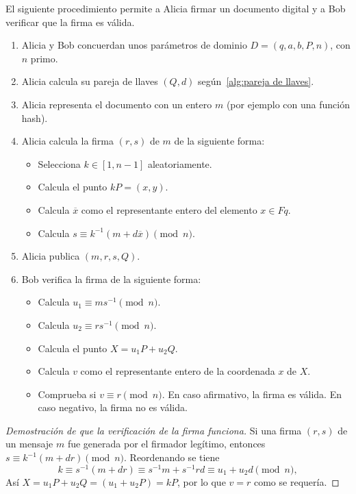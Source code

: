 \begin{protocolo}[ECDSA]
    El siguiente procedimiento permite a Alicia firmar un documento digital y a Bob verificar que la firma es válida.
    \begin{enumerate}
        \item Alicia y Bob concuerdan unos parámetros de dominio $D = (q, a, b, P, n)$, con $n$ primo.
        \item Alicia calcula su pareja de llaves $(Q, d)$ según~\ref{alg:pareja de llaves}.
        \item Alicia representa el documento con un entero $m$ (por ejemplo con una función hash).
        \item Alicia calcula la firma $(r, s)$ de $m$ de la siguiente forma:
        \begin{itemize}
            \item Selecciona $k \in [1, n - 1]$ aleatoriamente.
            \item Calcula el punto $k P = (x, y)$.
            \item Calcula $\overline{x}$ como el representante entero del elemento $x \in Fq$.
            \item Calcula $s \equiv k^{-1} (m + d \overline{x}) \pmod{n}$.
        \end{itemize}
        \item Alicia publica $(m, r, s, Q)$.
        \item Bob verifica la firma de la siguiente forma:
        \begin{itemize}
            \item Calcula $u_1 \equiv m s^{-1} \pmod{n}$.
            \item Calcula $u_2 \equiv r s^{-1} \pmod{n}$.
            \item Calcula el punto $X = u_1 P + u_2 Q$.
            \item Calcula $v$ como el representante entero de la coordenada $x$ de $X$.
            \item Comprueba si $v \equiv r \pmod{n}$. En caso afirmativo, la firma es válida. En caso negativo, la firma no es válida.
        \end{itemize}
    \end{enumerate}
\end{protocolo}
\begin{proof}[Demostración de que la verificación de la firma funciona]
Si una firma $(r, s)$ de un mensaje $m$ fue generada por el firmador legítimo, entonces $s \equiv k^{-1} (m + d r) \pmod{n}$. Reordenando se tiene
$$
    k \equiv s^{-1} (m + d r) \equiv s^{-1} m + s^{-1} r d \equiv u_1 + u_2 d \pmod{n},
$$
Así $X = u_1 P + u_2 Q = (u_1 + u_2 P) = k P$, por lo que $v = r$ como se requería.
\end{proof}

